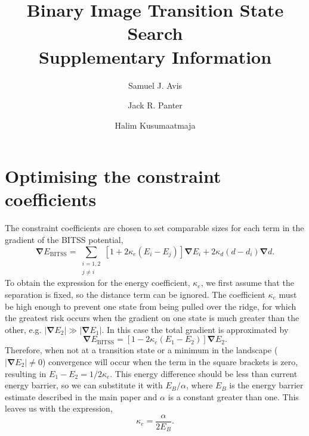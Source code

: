 \documentclass[aps,physrev,10pt]{revtex4-2}
\newcommand{\abs}[1]{\left| #1 \right|}
\newcommand{\grad}{\bm{\nabla}}
\begin{document}
\title{Binary Image Transition State Search \\ Supplementary Information}
\author{Samuel J. Avis}
\author{Jack R. Panter}
\author{Halim Kusumaatmaja}
\maketitle

\section{Optimising the constraint coefficients}
The constraint coefficients are chosen to set comparable sizes for each term in the gradient of the BITSS potential,
\begin{equation} \label{eq:gradBITSS}
  \grad E_\text{BITSS} = \sum_{\substack{i=1,2 \\ j\neq i}} \left[ 1 + 2 \kappa_e (E_i - E_j) \right] \grad E_i + 2 \kappa_d (d - d_i) \grad d.
\end{equation}
To obtain the expression for the energy coefficient, $\kappa_e$, we first assume that the separation is fixed, so the distance term can be ignored.
The coefficient $\kappa_e$ must be high enough to prevent one state from being pulled over the ridge, for which the greatest risk occurs when the gradient on one state is much greater than the other, e.g. $\abs{\grad E_2} \gg \abs{\grad E_1}$.
In this case the total gradient is approximated by
\begin{equation}
  \grad E_\text{BITSS} = \left[ 1 - 2 \kappa_e (E_1 - E_2) \right] \grad E_2.
\end{equation}
Therefore, when not at a transition state or a minimum in the landscape ($\abs{\grad E_2} \neq 0$) convergence will occur when the term in the square brackets is zero, resulting in $E_1 - E_2 = 1 / 2 \kappa_e$.
This energy difference should be less than current energy barrier, so we can substitute it with $E_B / \alpha$, where $E_B$ is the energy barrier estimate described in the main paper and $\alpha$ is a constant greater than one.
This leaves us with the expression,
\begin{equation}
  \kappa_e = \frac {\alpha} {2 E_B}.
\end{equation}
\end{document}
